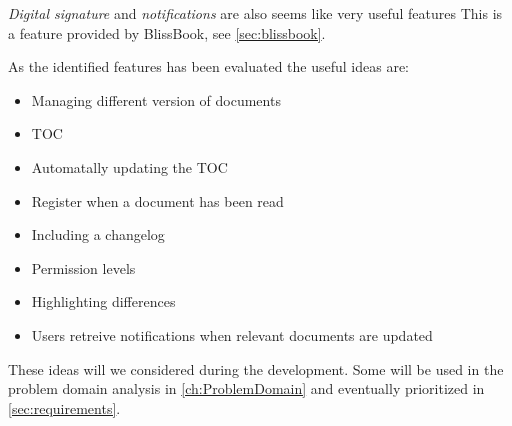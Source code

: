 \textit{Digital signature} and \textit{notifications} are also seems like very useful features
This is a feature provided by BlissBook, see \cref{sec:blissbook}.

As the identified features has been evaluated the useful ideas are:
\begin{itemize}
	\item Managing different version of documents
	\item TOC
	\item Automatally updating the TOC
	\item Register when a document has been read
	\item Including a changelog
	\item Permission levels
	\item Highlighting differences
	\item Users retreive notifications when relevant documents are updated
\end{itemize}

These ideas will we considered during the development.
Some will be used in the problem domain analysis in \cref{ch:ProblemDomain} and eventually prioritized in \cref{sec:requirements}.

